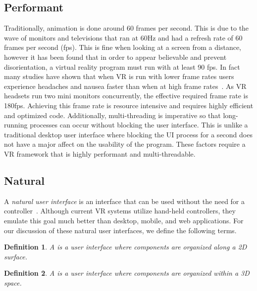 \documentclass[conference,12pt]{IEEEtran}
\newtheorem{definition}{Definition}
\begin{document}
\subsection{Performant}\label{sec:performant}

Traditionally, animation is done around 60 frames per second.  This is due to
the wave of monitors and televisions that ran at 60Hz and had a refresh rate of
60 frames per second (fps).  This is fine when looking at a screen from a
distance, however it has been found that in order to appear believable and
prevent disorientation, a virtual reality program must run with at least 90 fps.
In fact many studies have shown that when VR is run with lower frame rates users
experience headaches and nausea faster than when at high frame
rates~\cite{irisVR}. As VR headsets run two mini monitors concurrently, the
effective required frame rate is 180fps.  Achieving this frame rate is resource
intensive and requires highly efficient and optimized code. Additionally,
multi-threading is imperative so that long-running processes can occur without
blocking the user interface. This is unlike a traditional desktop user interface
where blocking the UI process for a second does not have a major affect on the
usability of the program. These factors require a VR framework that is highly
performant and multi-threadable.

\subsection{Natural}\label{sec:natural}

A \textit{natural user interface} is an interface that can be used without the
need for a controller~\cite{Wimmers:2015:VR:Natural-UI}. Although current VR
systems utilize hand-held controllers, they emulate this goal much better than
desktop, mobile, and web applications. For our discussion of these natural user
interfaces, we define the following terms.

\begin{definition}\label{def:planar-ui}
    A {\normalfont{}} is a user interface where components are
    organized along a 2D surface.
\end{definition}

\begin{definition}\label{def:spacial-ui}
    A {\normalfont{}} is a user interface where components are
    organized within a 3D space.
\end{definition}
\end{document}
